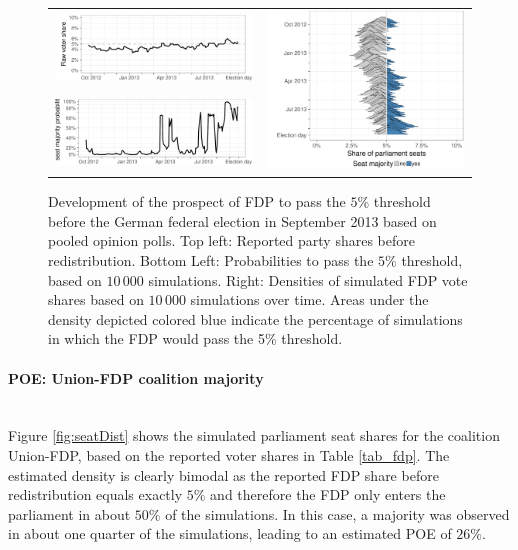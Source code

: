 \documentclass[smallcondensed]{svjour3}     %
\begin{document}
\begin{figure}[H]\centering
\begin{tabular}{ll}
\includegraphics[height=.15\textwidth]{figures/2013_pooled_fdp_rawShares.pdf}
&
\multirow{2}{*}[13ex]{\includegraphics[height=30ex]{figures/2013_pooled_fdp_ridgeline.pdf}}
\\
\includegraphics[height=.15\textwidth]{figures/2013_pooled_fdp_passingProb.pdf}
\end{tabular}
\caption{Development of the prospect of FDP to pass the $5\%$ threshold before the
German federal election in September 2013 based on pooled opinion polls.
Top left: Reported party shares before redistribution. Bottom Left: Probabilities
to pass the $5\%$ threshold, based on $10\,000$ simulations. Right: Densities of
simulated FDP vote shares based on $10\,000$ simulations over time. Areas under
the density depicted colored blue indicate the percentage of simulations in which
the FDP would pass the 5\% threshold.
\label{fig:2013_fdp}
}
\end{figure}


\paragraph{POE: Union-FDP coalition majority} \ \\

Figure \ref{fig:seatDist} shows the simulated
parliament seat shares for the coalition Union-FDP, based on the reported
voter shares in Table \ref{tab_fdp}. The estimated density is clearly bimodal
as the reported FDP share before redistribution equals exactly $5\%$ and
therefore the FDP only enters the parliament in about $50\%$ of the simulations.
In this case, a majority was observed in about one quarter of the simulations,
leading to an estimated POE of $26\%$.
\end{document}
